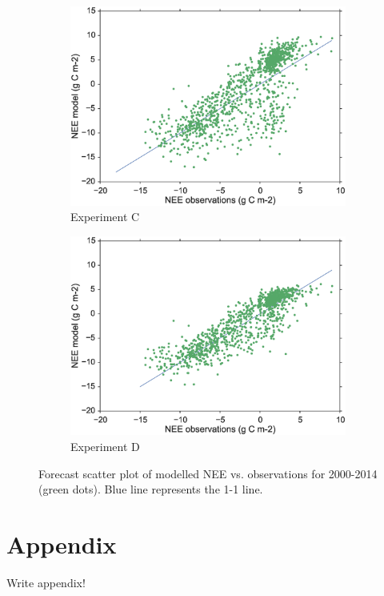 \documentclass[11pt]{article}
\begin{document}
\begin{figure}
\begin{subfigure}[b]{0.49\textwidth}
        \includegraphics[width=\textwidth]{Cfscat.eps}
        \caption{Experiment C}
        \label{fig:mouse}
    \end{subfigure}
    \begin{subfigure}[b]{0.49\textwidth}
        \includegraphics[width=\textwidth]{Dfscat.eps}
        \caption{Experiment D}
        \label{fig:mouse}
    \end{subfigure}
    \caption{Forecast scatter plot of modelled NEE vs. observations for 2000-2014 (green dots). Blue line represents the 1-1 line.}\label{fig:animals}
\end{figure}

{}
%

\section*{Appendix}

{\color{red} Write appendix!}
\end{document}
